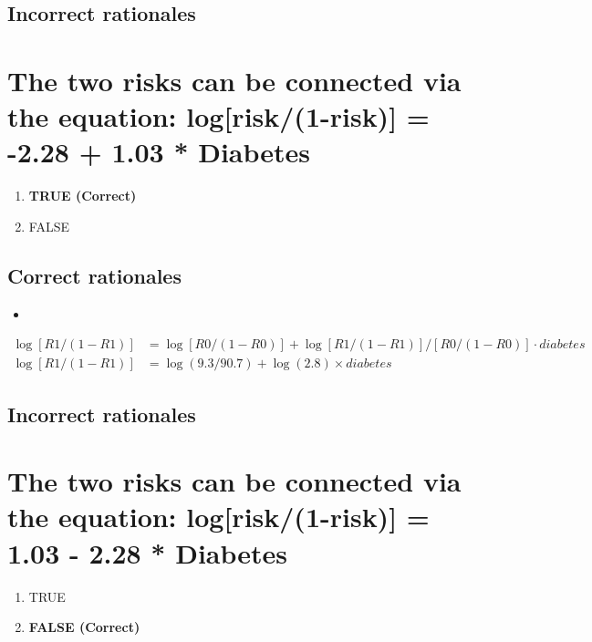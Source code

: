 \documentclass[letterpaper,9pt,twoside,printwatermark=false]{pinp}
\providecommand{\tightlist}{%
  \setlength{\itemsep}{0pt}\setlength{\parskip}{0pt}}
\begin{document}
\subsection{Incorrect rationales}\label{incorrect-rationales-4}

\section{The two risks can be connected via the equation:
log{[}risk/(1-risk){]} = -2.28 + 1.03 *
Diabetes}\label{the-two-risks-can-be-connected-via-the-equation-logrisk1-risk--2.28-1.03-diabetes}

\begin{enumerate}
\def\labelenumi{\alph{enumi}.}
\tightlist
\item
  \textbf{TRUE (Correct)}
\item
  FALSE
\end{enumerate}

\subsection{Correct rationales}\label{correct-rationales-5}

\begin{itemize}
\item
\end{itemize}

\begin{align*}
\log[R1/(1-R1)] &= \log [R0/(1-R0)] + \log {[R1/(1-R1)] /[R0/(1-R0)]} \cdot diabetes\\
\log [R1/(1-R1)] &= \log(9.3/90.7) + \log(2.8) \times diabetes 
\end{align*}

\subsection{Incorrect rationales}\label{incorrect-rationales-5}

\section{The two risks can be connected via the equation:
log{[}risk/(1-risk){]} = 1.03 - 2.28 *
Diabetes}\label{the-two-risks-can-be-connected-via-the-equation-logrisk1-risk-1.03---2.28-diabetes}

\begin{enumerate}
\def\labelenumi{\alph{enumi}.}
\tightlist
\item
  TRUE
\item
  \textbf{FALSE (Correct)}
\end{enumerate}
\end{document}
